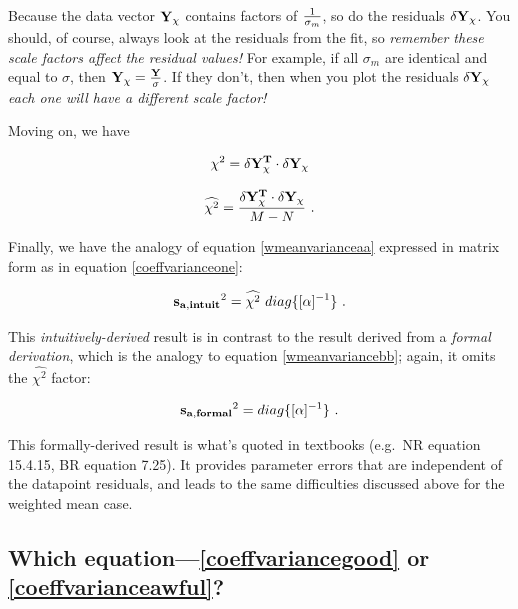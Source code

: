 \documentclass[psfig,preprint]{aastex}
\begin{document}
\begin{mathletters}
\noindent Because the data vector $\bf Y_\chi$ contains factors of $1
\over \sigma_m$, so do the residuals $\delta {\bf Y_\chi}$.  You should,
of course, always look at the residuals from the fit, so {\it remember
these scale factors affect the residual values!} For example, if all
$\sigma_m$ are identical and equal to $\sigma$, then ${\bf Y_\chi} =
{\bf Y \over \sigma}$. If they don't, then when you plot the residuals
$\delta {\bf Y_\chi}$ {\it each one will have a different scale factor!}

	Moving on, we have

\begin{equation}
\label{chisq}
\chi^2 =  {\bf \delta Y_\chi^T \cdot \delta Y_\chi}
\end{equation}

\begin{equation}
\label{reducedchisq}
\widehat{\chi^2} = { {\bf \delta Y_\chi^T \cdot \delta Y_\chi} \over M-N} \ .
\end{equation}
\end{mathletters}

\noindent Finally, we have the analogy of equation \ref{wmeanvarianceaa}
expressed in matrix form as in equation \ref{coeffvarianceone}:

\begin{equation} \label{coeffvariancegood}
{\bf s_{a,intuit}}^2 = \widehat{\chi^2} \ diag \{[\alpha]^{-1} \}  \ .
\end{equation}

\noindent This {\it intuitively-derived} result is in contrast to the
result derived from a {\it formal derivation}, which is the analogy to
equation \ref{wmeanvariancebb}; again, it omits the $\widehat{\chi^2}$
factor: 

\begin{equation} \label{coeffvarianceawful}
{\bf s_{a,formal}}^2 = diag \{[\alpha]^{-1} \} \ .
\end{equation}

\noindent This formally-derived result is what's quoted in textbooks
(e.g.\ NR equation 15.4.15, BR equation 7.25). It provides parameter
errors that are independent of the datapoint residuals, and leads to the
same difficulties discussed above for the weighted mean case.

\subsection{Which equation---\ref{coeffvariancegood} or
\ref{coeffvarianceawful}?}
\end{document}
